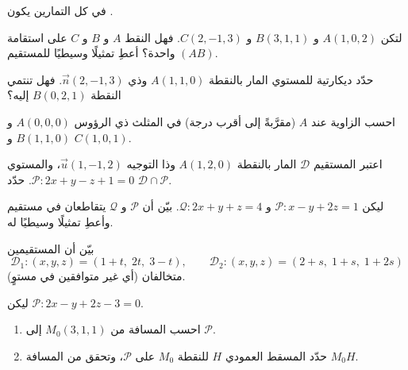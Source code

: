 في كل التمارين يكون  .

\begin{exercise}[$\star$]\label{exo:g12:space:1}
لتكن $A(1, 0, 2)$ و $B(3, 1, 1)$ و $C(2, -1, 3)$. فهل النقط $A$ و $B$ و
$C$ على استقامة واحدة؟ أعطِ تمثيلًا وسيطيًا للمستقيم $(AB)$.
\end{exercise}

\begin{exercise}[$\star$]\label{exo:g12:space:2}
حدّد  ديكارتية للمستوي المار بالنقطة $A(1, 1, 0)$ وذي
 $\vec n(2, -1, 3)$. فهل تنتمي النقطة $B(0, 2, 1)$ إليه؟
\end{exercise}

\begin{exercise}[$\star$]\label{exo:g12:space:3}
احسب الزاوية عند $A$ (مقرَّبةً إلى أقرب درجة) في المثلث ذي
الرؤوس $A(0,0,0)$ و $B(1, 1, 0)$ و $C(1, 0, 1)$.
\end{exercise}

\begin{exercise}[$\star\star$]\label{exo:g12:space:4}
اعتبر المستقيم $\mathcal D$ المار بالنقطة $A(1, 2, 0)$ وذا التوجيه
$\vec u(1, -1, 2)$، والمستوي $\mathcal P : 2x + y - z + 1 = 0$.
حدّد $\mathcal D \cap \mathcal P$.
\end{exercise}

\begin{exercise}[$\star\star$]\label{exo:g12:space:5}
ليكن $\mathcal P : x - y + 2z = 1$ و $\mathcal Q : 2x + y + z = 4$.
بيّن أن $\mathcal P$ و $\mathcal Q$ يتقاطعان في مستقيم وأعطِ
تمثيلًا وسيطيًا له.
\end{exercise}

\begin{exercise}[$\star\star$]\label{exo:g12:space:6}
بيّن أن المستقيمين
\[
\mathcal D_1 : (x, y, z) = (1 + t,\; 2t,\; 3 - t), \qquad
\mathcal D_2 : (x, y, z) = (2 + s,\; 1 + s,\; 1 + 2s)
\]
متخالفان (أي غير متوافقين في مستوٍ).
\end{exercise}

\begin{exercise}[$\star\star$]\label{exo:g12:space:7}
ليكن $\mathcal P : 2x - y + 2z - 3 = 0$.
\begin{enumerate}
  \item احسب المسافة من $M_0(3, 1, 1)$ إلى $\mathcal P$.
  \item حدّد  المسقط العمودي $H$ للنقطة
        $M_0$ على $\mathcal P$، وتحقق من المسافة $M_0H$.
\end{enumerate}
\end{exercise}

